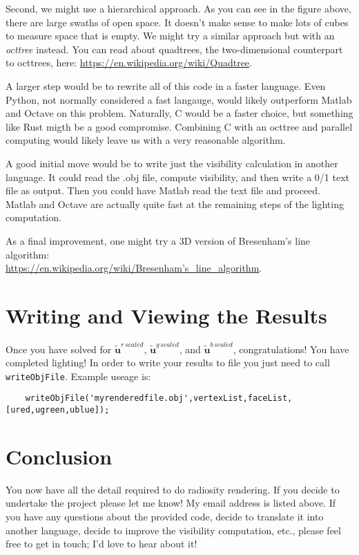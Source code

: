\documentclass{article}
\renewcommand{\v}[1]{\mathbf{#1}}
\newcommand{\tu}{\tilde{u}}
\begin{document}
Second, we might use a hierarchical approach.  As you can see in the figure above, there are large swaths of open space.  It doesn't make sense to make lots of cubes to measure space that is empty.  We might try a similar approach but with an \textit{octtree} instead.  You can read about quadtrees, the two-dimensional counterpart to octtrees, here: \href{https://en.wikipedia.org/wiki/Quadtree}{https://en.wikipedia.org/wiki/Quadtree}.

A larger step would be to rewrite all of this code in a faster language.  Even Python, not normally considered a fast langauge, would likely outperform Matlab and Octave on this problem.  Naturally, C would be a faster choice, but something like Rust migth be a good compromise.  Combining C with an octtree and parallel computing would likely leave us with a very reasonable algorithm.  

A good initial move would be to write just the visibility calculation in another language.  It could read the .obj file, compute visibility, and then write a 0/1 text file as output.  Then you could have Matlab read the text file and proceed.  Matlab and Octave are actually quite fast at the remaining steps of the lighting computation. 

As a final improvement, one might try a 3D version of Bresenham's line algorithm:\\ \href{https://en.wikipedia.org/wiki/Bresenham's_line_algorithm}{https://en.wikipedia.org/wiki/Bresenham's\_line\_algorithm}.


\section*{Writing and Viewing the Results}
Once you have solved for $\v \tu^{r\, scaled}$, $\v \tu^{g\, scaled}$, and $\v \tu^{b\, scaled}$, congratulations!  You have completed lighting! In order to write your results to file you just need to call \texttt{writeObjFile}. Example useage is:
\begin{verbatim}
    writeObjFile('myrenderedfile.obj',vertexList,faceList,[ured,ugreen,ublue]);
\end{verbatim}

\section*{Conclusion}
You now have all the detail required to do radiosity rendering.  If you decide to undertake the project please let me know! My email address is listed above.  If you have any questions about the provided code, decide to translate it into another language, decide to improve the visibility computation, etc., please feel free to get in touch; I'd love to hear about it!
\end{document}
